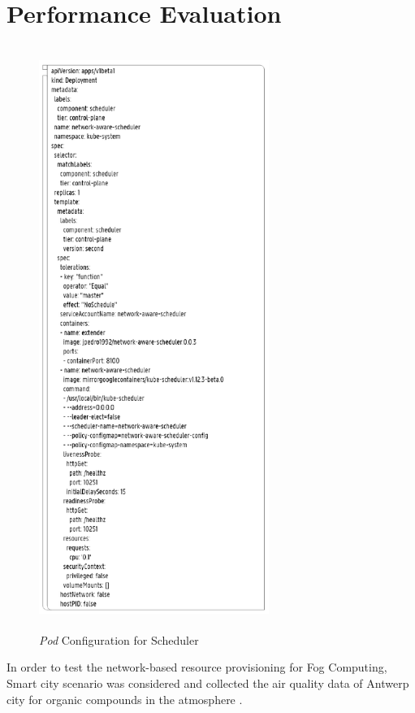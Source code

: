 \section{Performance Evaluation}
\label{sec:Performance_eval}
\begin{figure}
  \centering
  \includegraphics[width=75mm, height=19cm]{figures/mlcn-k8s-pod-config.pdf}
  \caption{\emph{Pod} Configuration for Scheduler\cite{Santos2019}}
  \label{fig:k8s-pod-config}
\end{figure}
In order to test the network-based resource provisioning for Fog Computing, Smart city scenario was considered and collected the air quality data of Antwerp city for organic compounds in the atmosphere \cite{Santos2019}.
\vspace{-0.10cm}

